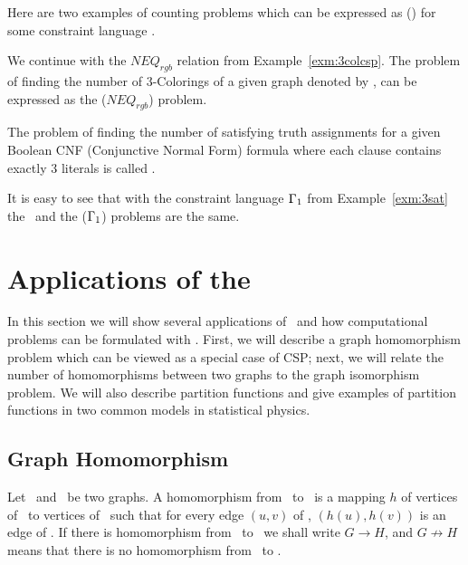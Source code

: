 Here are two examples of counting problems which can be expressed as \ccsp(\mrelset) for some
constraint language \mrelset\@.
\begin{example}[\ctcol]
We continue with the \(NEQ_{rgb}\) relation from Example~\ref{exm:3colcsp}\@.
The problem of finding the number of 3-Colorings of a given graph denoted by 
\ctcol, can be expressed as the \ccsp(\(NEQ_{rgb}\)) problem.
\end{example}

\begin{example}\label{exm:c3sat}
The problem of finding the number of satisfying truth assignments for a given 
Boolean CNF (Conjunctive Normal Form) formula where each clause contains exactly 3 literals
is called \ctsat\@. 

It is easy to see that with the constraint language \(\Gamma_1\) from Example~\ref{exm:3sat}
the \ctsat\ and the \ccsp(\(\Gamma_1\)) problems are the same.
\end{example} 
\section{Applications of the \ccsp} \label{sec:appl}
In this section we will show several applications of \ccsp\ and how computational problems
can be formulated with \ccsp\@. First, we will describe a graph
homomorphism problem which can be viewed as a special case of CSP; next, we will relate
the number of homomorphisms between two graphs to the graph isomorphism problem.
We will also describe partition functions
and give examples of partition functions in two common models in statistical physics.

\subsection*{Graph Homomorphism}
Let \mG\ and \mH\ be two graphs. A homomorphism from \mG\ to \mH\ is a mapping \(h\) of
vertices of \mG\ to vertices of \mH\ such that for every edge \((u,v)\) of \mG,
\((h(u),h(v))\) is an edge of \mH\@. If there is homomorphism from \mG\ to \mH\ 
we shall write \(G\to H\), and \(G \not\to H\) means that there is no homomorphism from
\mG\ to \mH\@.

